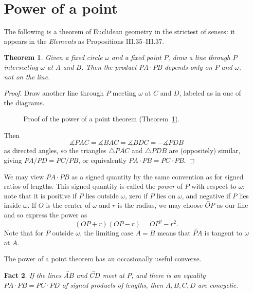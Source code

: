 \documentclass[12pt]{book}
\numberwithin{exc}{section}
\numberwithin{figure}{section}
\newtheorem{theorem}{Theorem}[section]
\newtheorem{fact}[theorem]{Fact}
\numberwithin{equation}{theorem}
\def\dang{\measuredangle} %
\def\line#1{\overleftrightarrow{#1}}
\begin{document}
\section{Power of a point}
\label{sec:powerofapoint}

The following is a theorem of Euclidean geometry in the strictest of senses:
it appears in the \textit{Elements}
as Propositions III.35--III.37.

\begin{theorem} \label{thm:powerofapoint}
Given a fixed circle $\omega$ and a fixed point $P$, draw a line through $P$ 
intersecting $\omega$ at $A$ and $B$. Then the product $PA \cdot PB$ 
depends only on $P$ and $\omega$, not on the line.
\end{theorem}
\begin{proof}
Draw another line through $P$ meeting $\omega$ at $C$ and $D$, 
labeled as in one of the diagrams. 
\begin{figure}[ht]
\caption{Proof of the power of a point theorem 
(Theorem~\ref{thm:powerofapoint}).}
\end{figure}
Then
\[
\dang PAC = \dang BAC = \dang BDC  = -\dang PDB
\]
as directed angles, so the triangles $\triangle PAC$ and $\triangle PDB$ 
are (oppositely) 
similar, giving $PA/PD = PC/PB$, or equivalently $PA\cdot PB = PC\cdot 
PB$.
\end{proof}

We may view $PA \cdot PB$ as a signed quantity by the same convention
as for signed ratios of lengths.
This signed quantity
is called the \emph{power} of $P$ 
with respect to $\omega$; note that it is positive if $P$ lies outside
$\omega$, zero if $P$ lies on $\omega$, and negative if $P$ lies inside
$\omega$.
If $O$ is the center of $\omega$ and $r$ is the radius, we may
choose $\line{OP}$ as our line and so express the power as
\[
(OP + r)(OP - r) = OP^{2} - r^{2}.
\]
Note that
for $P$ outside $\omega$, the limiting case $A=B$ 
means that $\line{PA}$ is tangent to $\omega$ at $A$.

The power of a point theorem has an occasionally useful converse.
\begin{fact} \label{fact:power}
If the lines $\line{AB}$ 
and $\line{CD}$ meet at $P$, and there is an equality
$PA \cdot PB = PC \cdot PD$ of signed products of lengths,
then $A,B,C,D$ are concyclic.
\end{fact}
\end{document}
